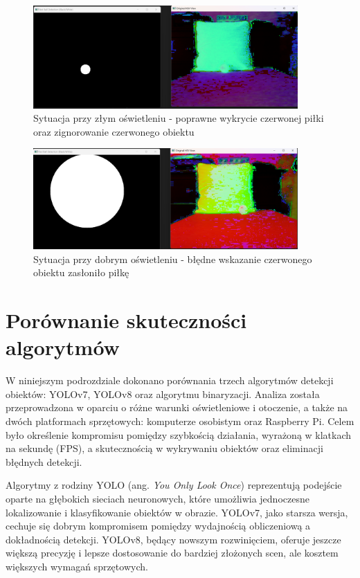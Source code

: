 \documentclass[a4paper,twoside,12pt]{book}
\begin{document}
\begin{figure}[h]
    \centering
    \includegraphics[width=0.9\textwidth]{Images/Porownanie/Binaryzacja/Zrzut ekranu 2025-01-02 193817.png}
    \caption{Sytuacja przy złym oświetleniu - poprawne wykrycie czerwonej piłki oraz zignorowanie czerwonego obiektu}
    \label{fig:Wykrycie piłki10}
\end{figure}
\begin{figure}[h]
    \centering
    \includegraphics[width=0.9\textwidth]{Images/Porownanie/Binaryzacja/Zrzut ekranu 2025-01-02 193917.png}
    \caption{Sytuacja przy dobrym oświetleniu - błędne wskazanie czerwonego obiektu zasłoniło piłkę}
    \label{fig:Wykrycie piłki11}
\end{figure}

\newpage
\section{Porównanie skuteczności algorytmów}

W niniejszym podrozdziale dokonano porównania trzech algorytmów detekcji obiektów: YOLOv7, YOLOv8 oraz algorytmu binaryzacji. Analiza została przeprowadzona w oparciu o różne warunki oświetleniowe i otoczenie, a także na dwóch platformach sprzętowych: komputerze osobistym oraz Raspberry Pi. Celem było określenie kompromisu pomiędzy szybkością działania, wyrażoną w klatkach na sekundę (FPS), a skutecznością w wykrywaniu obiektów oraz eliminacji błędnych detekcji.

Algorytmy z rodziny YOLO (ang. \textit{You Only Look Once}) reprezentują podejście oparte na głębokich sieciach neuronowych, które umożliwia jednoczesne lokalizowanie i klasyfikowanie obiektów w obrazie. YOLOv7, jako starsza wersja, cechuje się dobrym kompromisem pomiędzy wydajnością obliczeniową a dokładnością detekcji. YOLOv8, będący nowszym rozwinięciem, oferuje jeszcze większą precyzję i lepsze dostosowanie do bardziej złożonych scen, ale kosztem większych wymagań sprzętowych.
\end{document}
